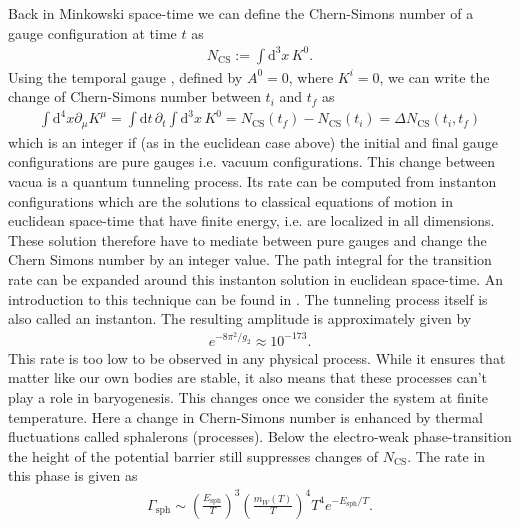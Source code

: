 \documentclass[13pt,a4paper,titlepage]{article}
\begin{document}
\noindent
Back in Minkowski space-time we can define the Chern-Simons number of a gauge configuration at time $t$ as \cite[eq. 23]{Dine_2003_Bayrogenesis}
\begin{align}
    N_{\mathrm{CS}} := \int \mathrm{d}^3 x \, K^0.
\end{align}
Using the temporal gauge \cite{temporal_gauge_10.1007/BFb0015141}, defined by $A^0 = 0$, where $K^i = 0$, we can
write the change of Chern-Simons number between $t_i$ and $t_f$ as
\begin{align}
    \int \mathrm{d}^4 x \partial_\mu K^\mu = \int \mathrm{d} t \, \partial_t \int \mathrm{d}^3 x \, K^0 =
    N_{\mathrm{CS}}(t_f) - N_{\mathrm{CS}}(t_i) = \Delta N_{\mathrm{CS}}(t_i, t_f)
\end{align}
which is an integer if (as in the euclidean case above) the initial and final gauge configurations are pure gauges i.e. vacuum configurations.
This change between vacua is a quantum tunneling process. Its rate can be computed from instanton configurations which are the solutions to classical equations of motion in euclidean space-time that have finite energy, i.e. are localized in all dimensions. These solution therefore have to mediate between pure  gauges and change the Chern Simons number by an integer value.
The path integral for the transition rate can be expanded around this instanton solution in euclidean space-time. An introduction to this technique can be found in \cite[Chap. 7]{aspects_of_symmmetry}. The tunneling process itself is also called an instanton.
The resulting amplitude is approximately given by \cite[4.8]{Cline:2006ts_Baryogenesis}
\begin{align}
    e^{-8 \pi^2 / g_2} \approx 10^{-173}.
\end{align}
This rate is too low to be observed in any physical process. While it ensures
that matter like our own bodies are stable, it also means that these processes
can't play a role in baryogenesis.
This changes once we consider the system at finite temperature.
Here a change in Chern-Simons number is enhanced by thermal fluctuations called sphalerons (processes).
Below the electro-weak phase-transition the height of the potential barrier still
suppresses changes of $N_{\mathrm{CS}}$.
The rate in this phase is given as \cite[eq. 4.10]{Cline:2006ts_Baryogenesis}
\begin{align}
    \Gamma_{\mathrm{sph}} \sim \left( \frac{E_{\mathrm{sph}}}{T} \right)^3 \left( \frac{m_W(T)}{T} \right)^4 T^4 e^{- E_{\mathrm{sph}} / T}.
\end{align}
\end{document}
